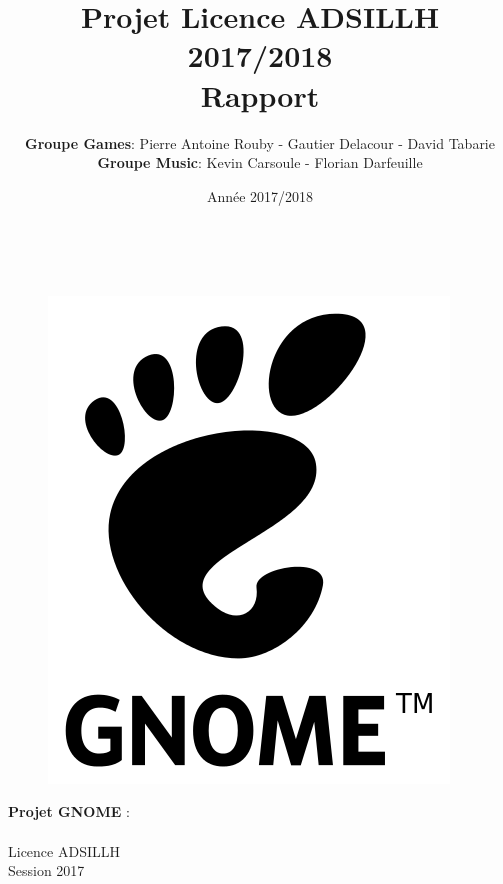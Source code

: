 \documentclass[12pt]{report}
\title{Projet Licence ADSILLH 2017/2018\\Rapport}
\author{\textbf{Groupe Games}: Pierre Antoine Rouby - Gautier Delacour - David Tabarie\\
  \textbf{Groupe Music}: Kevin Carsoule - Florian Darfeuille\newline}
\date{Année 2017/2018}
\begin{document}
\makeatletter
\begin{titlepage}
  \centering
  \begin{figure}
    \centering
    \vspace{1cm}
    \textcolor{SteelBlue}{}\\
    \vspace{-5cm}
  \end{figure}


  \begin{figure}
    \centering
    \vspace{14cm}
          \vspace{2cm}
          \includegraphics[scale=0.2]{images/Gnomelogo_svg.png}
    \vspace{-15cm}
  \end{figure}

  
  \begin{flushleft}
    \centering
    \large{\textbf{Projet GNOME}} :\\{\@author}\\ 
    Licence ADSILLH\\
    Session 2017
  \end{flushleft}


  \vspace{15cm}



\end{titlepage}
\end{document}
